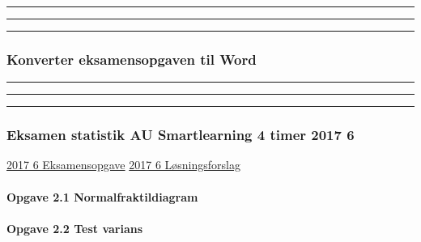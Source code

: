 \documentclass[]{book}
\let\oldparagraph\paragraph
\renewcommand{\paragraph}[1]{\oldparagraph{#1}\mbox{}}
\begin{document}
\begin{center}\rule{0.5\linewidth}{\linethickness}\end{center}

\begin{center}\rule{0.5\linewidth}{\linethickness}\end{center}

\begin{center}\rule{0.5\linewidth}{\linethickness}\end{center}

\hypertarget{konverter-eksamensopgaven-til-word}{%
\subsubsection{Konverter eksamensopgaven til Word}\label{konverter-eksamensopgaven-til-word}}

\begin{center}\rule{0.5\linewidth}{\linethickness}\end{center}

\begin{center}\rule{0.5\linewidth}{\linethickness}\end{center}

\begin{center}\rule{0.5\linewidth}{\linethickness}\end{center}

\hypertarget{eksamen-statistik-au-smartlearning-4-timer-2017-6}{%
\subsubsection{Eksamen statistik AU Smartlearning 4 timer 2017 6}\label{eksamen-statistik-au-smartlearning-4-timer-2017-6}}

\href{https://www.dropbox.com/s/dlgt1hnh6wu4aja/Statistik\%20eksamensopgave\%20juni\%202017\%20opgave\%202.pdf?dl=1}{2017 6 Eksamensopgave}
\href{https://www.dropbox.com/s/s0fl0lg2i2zk2hh/Eksamen\%202017\%20juni\%20opgave\%202\%20L\%C3\%98SNING.docx?dl=1}{2017 6 Løsningsforslag}

\hypertarget{opgave-2.1-normalfraktildiagram}{%
\paragraph{Opgave 2.1 Normalfraktildiagram}\label{opgave-2.1-normalfraktildiagram}}

\hypertarget{opgave-2.2-test-varians}{%
\paragraph{Opgave 2.2 Test varians}\label{opgave-2.2-test-varians}}
\end{document}

